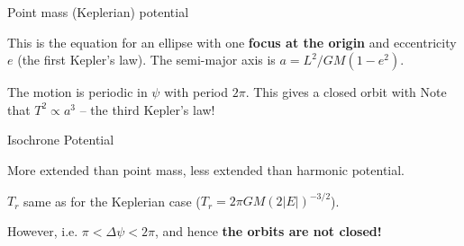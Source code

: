 \documentclass[letterpaper,landscape]{slides}
\begin{document}
\begin{slide}
\begin{center}
{\large \color{red} 
                Point mass (Keplerian) potential}
\end{center}

This is the equation for an ellipse with one {\bf focus at the origin} and
eccentricity $e$ (the first Kepler's law).  The semi-major axis is 
$a = L^2/GM(1-e^2)$. 

The motion is periodic in $\psi$ with period $2\pi$.  
This gives a closed orbit with 
Note that $T^2 \propto a^3$ -- the third Kepler's law!


\vfill
\end{slide}




\begin{slide}
\begin{center}
{\large \color{red} 
                 Isochrone Potential }
\end{center}

More extended than point mass, less extended than harmonic potential.

$T_r$ same as for the Keplerian case ($T_r = 2\pi GM (2|E|)^{-3/2}$).

However, 
i.e. $\pi < \Delta \psi < 2 \pi$, and hence {\bf the orbits are not closed!}



\vfill
\end{slide}
\end{document}
